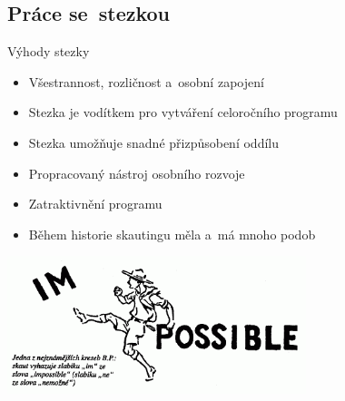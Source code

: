 \documentclass[compress, ucs, xelatex, 11pt, xcolor=dvipsnames, print, aspectratio=169,
	hyperref={
		bookmarks=true,
		unicode=true,
		colorlinks=true,
		pdftitle={Skautska vychovna metoda},
		plainpages=false,
		pdfauthor={Vojtech Zeisek},
		pdfsubject={Skautska vychovna metoda a jeji vyvoj za posledni stoleti a desetileti},
		pdfcreator={XeLaTeX},
		pdfkeywords={Junak, Pedagogika, Skaut, Skauting, Vychovna metoda},
		linkcolor=Red, %
		anchorcolor=ForestGreen, %
		citecolor=ForestGreen, %
		filecolor=ForestGreen, %
		menucolor=ForestGreen, %
		urlcolor=Sepia, %
		pdftex},
	url={hyphens, lowtilde} %
	]{beamer}
\begin{document}
\subsection{Práce se~stezkou}

\begin{frame}{Výhody stezky}
	\begin{itemize}
		\item Všestrannost, rozličnost a~osobní zapojení
		\item Stezka je vodítkem pro vytváření celoročního programu
		\item Stezka umožňuje snadné přizpůsobení oddílu
		\item Propracovaný nástroj osobního rozvoje
		\item Zatraktivnění programu
		\item Během historie skautingu měla a~má mnoho podob
	\end{itemize}
	\begin{center}
		\includegraphics[height=4cm]{im-possible_m.png}
	\end{center}
\end{frame}
\end{document}
